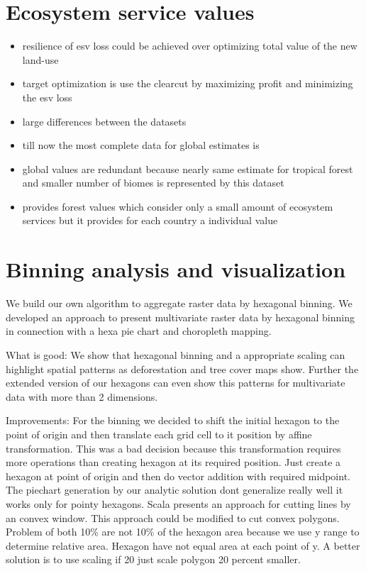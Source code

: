 	\section{Ecosystem service values}
		\begin{itemize}
			\item resilience of esv loss could be achieved over optimizing total value of the new land-use
			\item target optimization is use the clearcut by maximizing profit and minimizing the esv loss
			\item large differences between the datasets
			\item till now the most complete data for global estimates is \citeauthor{Costanza2014}
			\item \citeauthor{Groot2012} global values are redundant because nearly same estimate for tropical forest and smaller number of biomes is represented by this dataset
			\item \citeauthor{Siikamaki2015} provides forest values which consider only a small amount of ecosystem services but it provides for each country a individual value
		\end{itemize}

	\section{Binning analysis and visualization}
		We build our own algorithm to aggregate raster data by hexagonal binning. We developed an approach to present multivariate raster data by hexagonal binning in connection with a hexa pie chart and choropleth mapping.

		What is good:
		We show that hexagonal binning and a appropriate scaling can highlight spatial patterns as deforestation and tree cover maps show. Further the extended version of our hexagons can even show this patterns for multivariate data with more than 2 dimensions.

		Improvements:
		For the binning we decided to shift the initial hexagon to the point of origin and then translate each grid cell to it position by affine transformation. This was a bad decision because this transformation requires more operations than creating hexagon at its required position. Just create a hexagon at point of origin and then do vector addition with required midpoint. The piechart generation by our analytic solution dont generalize really well it works only for pointy hexagons. Scala presents an approach for cutting lines by an convex window. This approach could be modified to cut convex polygons. Problem of both 10\% are not 10\% of the hexagon area because we use y range to determine relative area. Hexagon have not equal area at each point of y. A better solution is to use scaling if 20 just scale polygon 20 percent smaller.

